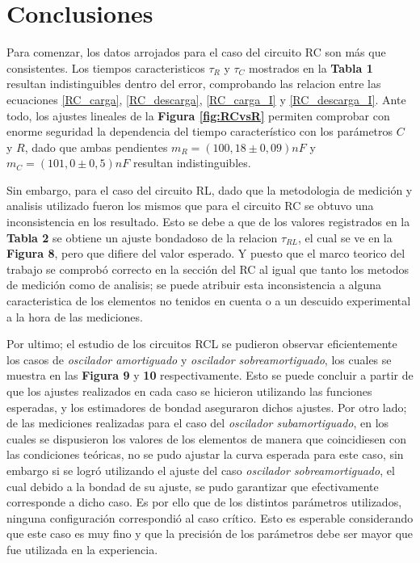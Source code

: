 \documentclass[11pt,a4paper]{article}
\begin{document}
\section{Conclusiones}
\label{sec:conclusiones}

Para comenzar, los datos arrojados para el caso del circuito RC son más que consistentes. Los tiempos caracteristicos $\tau_R$ y $\tau_C$ mostrados en la \textbf{Tabla 1} resultan indistinguibles dentro del error, comprobando las relacion entre las ecuaciones \eqref{RC_carga}, \eqref{RC_descarga}, \eqref{RC_carga_I} y \eqref{RC_descarga_I}. Ante todo, los ajustes lineales de la \textbf{Figura \ref{fig:RCvsR}} permiten comprobar con enorme seguridad la dependencia del tiempo característico con los parámetros $C$ y $R$, dado que ambas pendientes $m_R = (100,18 \pm 0,09)nF$ y $m_C = (101,0 \pm 0,5)nF$ resultan indistinguibles.

Sin embargo, para el caso del circuito RL, dado que la metodologia de medición y analisis utilizado fueron los mismos que para el circuito RC se obtuvo una inconsistencia en los resultado. Esto se debe a que de los valores registrados en la \textbf{Tabla 2} se obtiene un ajuste bondadoso de la relacion $\tau_{RL}$, el cual se ve en la \textbf{Figura 8}, pero que difiere del valor esperado. Y puesto que el marco teorico del trabajo se comprobó correcto en la sección del RC al igual que tanto los metodos de medición como de analisis; se puede atribuir esta inconsistencia a alguna caracteristica de los elementos no tenidos en cuenta o a un descuido experimental a la hora de las mediciones.

Por ultimo; el estudio de los circuitos RCL se pudieron observar eficientemente los casos de \textit{oscilador amortiguado} y \textit{oscilador sobreamortiguado}, los cuales se muestra en las \textbf{Figura 9} y \textbf{10} respectivamente. Esto se puede concluir a partir de que los ajustes realizados en cada caso se hicieron utilizando las funciones esperadas, y los estimadores de bondad aseguraron dichos ajustes. Por otro lado; de las mediciones realizadas para el caso del \textit{oscilador subamortiguado}, en los cuales se dispusieron los valores de los elementos de manera que coincidiesen con las condiciones teóricas, no se pudo ajustar la curva esperada para este caso, sin embargo si se logró utilizando el ajuste del caso \textit{oscilador sobreamortiguado}, el cual debido a la bondad de su ajuste, se pudo garantizar que efectivamente corresponde a dicho caso. Es por ello que de los distintos parámetros utilizados, ninguna configuración correspondió al caso crítico. Esto es esperable considerando que este caso es muy fino y que la precisión de los parámetros debe ser mayor que fue utilizada en la experiencia.
\end{document}
